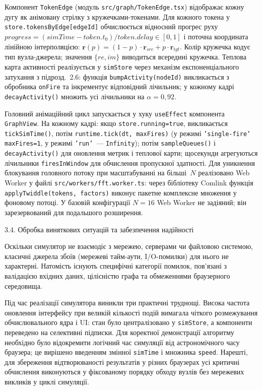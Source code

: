 Компонент \texttt{TokenEdge} (модуль \texttt{src/graph/TokenEdge.tsx})
відображає кожну дугу як анімовану стрілку з кружечками-токенами. Для
кожного токена у \texttt{store.tokensByEdge[edgeId]} обчислюється
відносний прогрес руху
\(progress=(simTime-token.t_0)/token.delay\in[0,1]\) і поточна
координата лінійною інтерполяцією:
\(\mathbf{r}(p)=(1-p)\cdot\mathbf{r}_{src}+p\cdot\mathbf{r}_{tgt}\).
Колір кружечка кодує тип вузла-джерела; значення \(\{re,im\}\)
виводиться всередині кружечка. Теплова карта активності реалізується у
\texttt{simStore} через механізм експоненціального затухання з
підрозд.~2.6: функція \texttt{bumpActivity(nodeId)} викликається з
обробника \texttt{onFire} та інкрементує відповідний лічильник; у кожному
кадрі \texttt{decayActivity()} множить усі лічильники на
\(\alpha=0{,}92\).

Головний анімаційний цикл запускається у хуку \texttt{useEffect}
компонента \texttt{GraphView}. На кожному кадрі: якщо
\texttt{store.running=true}, викликається \texttt{tickSimTime()}, потім
\texttt{runtime.tick(dt, maxFires)} (у режимі \texttt{'single-fire'}
\texttt{maxFires=1}, у режимі \texttt{'run'}~--- \texttt{Infinity}); потім
\texttt{sampleQueues()} і \texttt{decayActivity()} для оновлення метрик і
теплової карти; щосекунди агрегуються лічильники \texttt{firesInWindow}
для обчислення пропускної здатності. Для уникнення блокування головного
потоку при масштабуванні на більші~\(N\) реалізовано Web Worker у файлі
\texttt{src/workers/fft.worker.ts}: через бібліотеку Comlink функція
\texttt{applyTwiddle(tokens, factors)} виконує пакетне комплексне
множення у фоновому потоці. У базовій конфігурації \(N=16\) Web Worker
не задіяний; він зарезервований для подальшого розширення.

\protect{}\label{_Toc229681146}{}3.4. Обробка виняткових
ситуацій та забезпечення надійності

Оскільки симулятор не взаємодіє з мережею, серверами чи файловою
системою, класичні джерела збоїв (мережеві тайм-аути, I/O-помилки) для
нього не характерні. Натомість існують специфічні категорії помилок,
пов'язані з валідацією вхідних даних, цілісністю графа та обмеженнями
браузерного середовища.

Під час реалізації симулятора виникли три практичні труднощі. Висока
частота оновлення інтерфейсу при великій кількості подій вимагала
чіткого розмежування обчислювального ядра і UI: стан було централізовано
у \texttt{simStore}, а компоненти переведено на селективні підписки. Для
коректної демонстрації алгоритму необхідно було відокремити логічний час
симуляції від астрономічного часу браузера; це вирішено введенням змінної
\texttt{simTime} і множника \texttt{speed}. Нарешті, для збереження
відтворюваності результатів у різних браузерах усі критичні обчислення
виконуються у фіксованому порядку обходу вузлів без мережевих викликів
у циклі симуляції.

